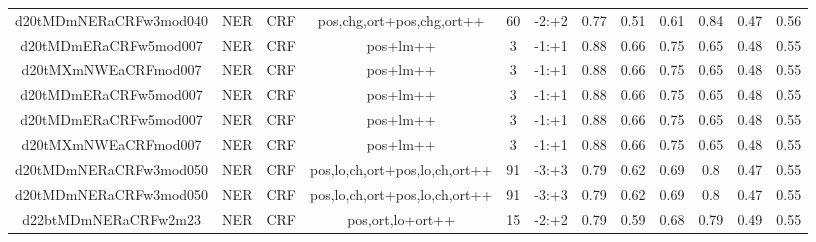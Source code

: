 \documentclass[a4paper]{article}
\begin{document}
\begin{landscape}
\begin{center}
\begin{tabular}{ |c|c|c|c|c|c|c|c|c|c|c|c|}
 	
 
 	
 		
 		\small{ d20tMDmNERaCRFw3mod040 } & NER & CRF & pos,chg,ort+pos,chg,ort++  &  60 &  -2:+2  &  0.77 & 0.51 & 0.61  &  0.84 & 0.47 & 0.56 \\
 		

 	
 
 	
 		
 		\small{ d20tMDmERaCRFw5mod007 } & NER & CRF & pos+lm++  &  3 &  -1:+1  &  0.88 & 0.66 & 0.75  &  0.65 & 0.48 & 0.55 \\
 		

 	
 
 	
 		
 		\small{ d20tMXmNWEaCRFmod007 } & NER & CRF & pos+lm++  &  3 &  -1:+1  &  0.88 & 0.66 & 0.75  &  0.65 & 0.48 & 0.55 \\
 		

 	
 
 	
 		
 		\small{ d20tMDmERaCRFw5mod007 } & NER & CRF & pos+lm++  &  3 &  -1:+1  &  0.88 & 0.66 & 0.75  &  0.65 & 0.48 & 0.55 \\
 		

 	
 
 	
 		
 		\small{ d20tMDmERaCRFw5mod007 } & NER & CRF & pos+lm++  &  3 &  -1:+1  &  0.88 & 0.66 & 0.75  &  0.65 & 0.48 & 0.55 \\
 		

 	
 
 	
 		
 		\small{ d20tMXmNWEaCRFmod007 } & NER & CRF & pos+lm++  &  3 &  -1:+1  &  0.88 & 0.66 & 0.75  &  0.65 & 0.48 & 0.55 \\
 		

 	
 
 	
 		
 		\small{ d20tMDmNERaCRFw3mod050 } & NER & CRF & pos,lo,ch,ort+pos,lo,ch,ort++  &  91 &  -3:+3  &  0.79 & 0.62 & 0.69  &  0.8 & 0.47 & 0.55 \\
 		

 	
 
 	
 		
 		\small{ d20tMDmNERaCRFw3mod050 } & NER & CRF & pos,lo,ch,ort+pos,lo,ch,ort++  &  91 &  -3:+3  &  0.79 & 0.62 & 0.69  &  0.8 & 0.47 & 0.55 \\
 		

 	
 
 	
 		
 		\small{ d22btMDmNERaCRFw2m23 } & NER & CRF & pos,ort,lo+ort++  &  15 &  -2:+2  &  0.79 & 0.59 & 0.68  &  0.79 & 0.49 & 0.55 \\
 		


\end{tabular}
\end{center}
\end{landscape}
\end{document}
